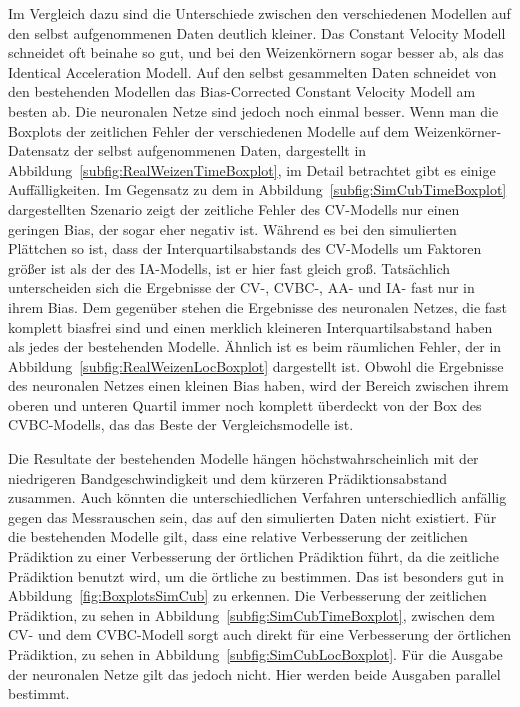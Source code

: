 Im Vergleich dazu sind die Unterschiede zwischen den verschiedenen Modellen auf den selbst aufgenommenen Daten deutlich kleiner.
Das Constant Velocity Modell schneidet oft beinahe so gut,
und bei den Weizenkörnern sogar besser ab, als das Identical Acceleration Modell.
Auf den selbst gesammelten Daten schneidet von den bestehenden Modellen das Bias-Corrected Constant Velocity Modell am besten ab. 
Die neuronalen Netze sind jedoch noch einmal besser. 
Wenn man die Boxplots der zeitlichen Fehler der verschiedenen Modelle auf dem Weizenkörner-Datensatz der selbst aufgenommenen Daten, dargestellt in Abbildung~\ref{subfig:RealWeizenTimeBoxplot},
im Detail betrachtet gibt es einige Auffälligkeiten. 
Im Gegensatz zu dem in Abbildung~\ref{subfig:SimCubTimeBoxplot} dargestellten Szenario
zeigt der zeitliche Fehler des CV-Modells nur einen geringen Bias, der sogar eher negativ ist.
Während es bei den simulierten Plättchen so ist, 
dass der Interquartilsabstands des CV-Modells um Faktoren größer ist als der des IA-Modells, ist er hier fast gleich groß.
Tatsächlich unterscheiden sich die Ergebnisse der CV-, CVBC-, AA- und IA- fast nur in ihrem Bias.
Dem gegenüber stehen die Ergebnisse des neuronalen Netzes, die fast komplett biasfrei sind und einen merklich kleineren Interquartilsabstand haben als jedes der bestehenden Modelle.
Ähnlich ist es beim räumlichen Fehler, der in Abbildung~\ref{subfig:RealWeizenLocBoxplot} dargestellt ist.
Obwohl die Ergebnisse des neuronalen Netzes einen kleinen Bias haben, wird der Bereich zwischen ihrem oberen und unteren Quartil immer noch komplett überdeckt von der Box des CVBC-Modells, das das Beste der Vergleichsmodelle ist.

Die Resultate der bestehenden Modelle hängen höchstwahrscheinlich mit der niedrigeren Bandgeschwindigkeit und dem kürzeren Prädiktionsabstand zusammen.
Auch könnten die unterschiedlichen Verfahren unterschiedlich anfällig gegen das Messrauschen sein, das auf den simulierten Daten nicht existiert.
Für die bestehenden Modelle gilt, dass eine relative Verbesserung der zeitlichen Prädiktion zu einer Verbesserung der örtlichen Prädiktion führt,
da die zeitliche Prädiktion benutzt wird, um die örtliche zu bestimmen.
Das ist besonders gut in Abbildung~\ref{fig:BoxplotsSimCub} zu erkennen. 
Die Verbesserung der zeitlichen Prädiktion, zu sehen in Abbildung~\ref{subfig:SimCubTimeBoxplot}, zwischen dem CV- und dem CVBC-Modell sorgt auch direkt für eine Verbesserung der örtlichen Prädiktion, zu sehen in Abbildung~\ref{subfig:SimCubLocBoxplot}.
Für die Ausgabe der neuronalen Netze gilt das jedoch nicht. Hier werden beide Ausgaben parallel bestimmt. 

